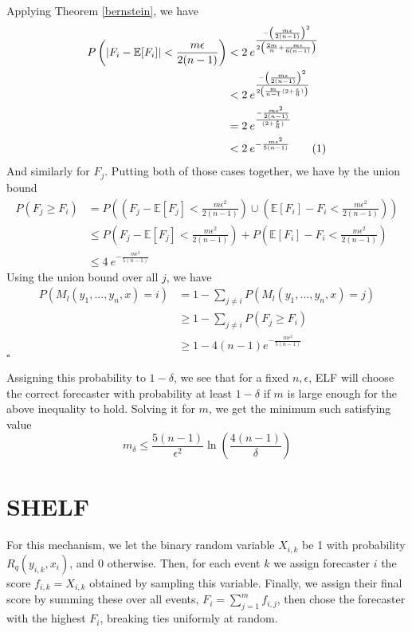 \documentclass[letterpaper,12pt]{article}
\newcommand{\E}{\mathbb{E}}
\newcommand{\1}{\mathbbm{1}}
\newcommand*{\QED}{\hfill\ensuremath{\square}}%
\newcommand\numberthis{\addtocounter{equation}{1}\tag{\theequation}}
\begin{document}
Applying Theorem \ref{bernstein}, we have
\begin{align*}
    P\left(\left| F_i - \E[F_i]\right| < \frac{m \epsilon}{2(n - 1)} \right) 
    &< 2 \: e^{\frac{-\left(\frac{m \epsilon}{2(n - 1)}\right)^2 }{2\left(\frac{2m}{n} + \frac{m \epsilon}{6(n - 1)}\right)}} \\
    &< 2 \: e^{\frac{-\left(\frac{m \epsilon}{2(n - 1)}\right)^2 }{2\left(\frac{m}{n-1}(2 + \frac{\epsilon}{6}) \right)}} \\
    &= 2 \: e^{\frac{-\frac{m \epsilon^2}{2(n - 1)} }{(2 + \frac{\epsilon}{6})}} \\
    &< 2 \: e^{-\frac{m \epsilon^2}{5(n - 1)} }  \numberthis \label{elf_bernstein} 
\end{align*}
And similarly for $F_j$. Putting both of those cases together, we have by the union bound
\begin{align*}
  P(F_j \geq F_i) &= P\left(\left(F_j - \E[F_j] < \frac{m \epsilon^2}{2(n - 1)}\right) \cup \left(\E[F_i] - F_i < \frac{m \epsilon^2}{2(n - 1)} \right) \right) \\
  &\leq P\left(F_j - \E[F_j] < \frac{m \epsilon^2}{2(n - 1)}\right) + P\left(\E[F_i] - F_i < \frac{m \epsilon^2}{2(n - 1)} \right) \\
  &\leq 4 \: e^{-\frac{m \epsilon^2}{5(n - 1)} }
\end{align*}
Using the union bound over all $j$, we have
\begin{align*}
  P\left(M_l(y_1, ..., y_n, x) = i\right)
  &= 1 - \sum_{j\neq i} P\left(M_l(y_1, ..., y_n, x) = j\right) \\
  &\geq 1 - \sum_{j\neq i} P\left(F_j \geq F_i\right) \\
  &\geq 1 - 4 (n-1) e^{-\frac{m \epsilon^2}{5(n - 1)}} 
\end{align*}
\hfill\QED

Assigning this probability to $1 - \delta$, we see that for a fixed $n, \epsilon$, ELF will choose the correct forecaster with probability at least $1 - \delta$ if $m$ is large enough for the above inequality to hold. Solving it for $m$, we get the minimum such satisfying value
\[m_\delta \leq \frac{5(n-1)}{\epsilon^2}\ln\left(\frac{4(n-1)}{\delta}\right) \]

\section{SHELF}
For this mechanism, we let the binary random variable $X_{i, k}$ be 1 with probability $R_q(y_{i, k}, x_i)$, and 0 otherwise. Then, for each event $k$ we assign forecaster $i$ the score $f_{i, k} = X_{i, k}$ obtained by sampling this variable. Finally, we assign their final score by summing these over all events, $F_i = \sum_{j=1}^m f_{i, j}$, then chose the forecaster with the highest $F_i$, breaking ties uniformly at random. 
\end{document}
